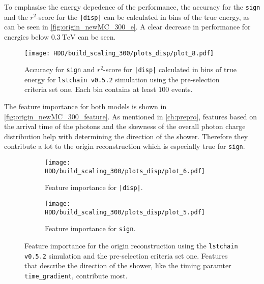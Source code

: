 To emphasise the energy depedence of the performance, the accuracy for the \texttt{sign} and the $r^2$-score for the \texttt{|disp|} can
be calculated in bins of the true energy, as can be seen in \autoref{fig:origin_newMC_300_e}.
A clear decrease in performance for energies below $\SI{0.3}{\tera\electronvolt}$ can be seen.
\begin{figure}
    \centering
    \texttt{[image: HDD/build\_scaling\_300/plots\_disp/plot\_8.pdf]}
    \caption{Accuracy for \texttt{sign} and $r^2$-score for \texttt{|disp|} calculated in bins of true energy for 
        \texttt{lstchain v0.5.2} simulation using the pre-selection criteria set one.
        Each bin contains at least $\num{100}$ events.
    }
    \label{fig:origin_newMC_300_e}
\end{figure}

The feature importance for both models is shown in \autoref{fig:origin_newMC_300_feature}.
As mentioned in \autoref{ch:prepro}, features based on the arrival time of the photons and the skewness of the overall photon charge distribution
help with determining the direction of the shower.
Therefore they contribute a lot to the origin reconstruction which is especially true for \texttt{sign}.
\begin{figure}
    \centering
    \begin{subfigure}{0.49\textwidth}
        \centering
        \texttt{[image: HDD/build\_scaling\_300/plots\_disp/plot\_6.pdf]}
        \caption{Feature importance for \texttt{|disp|}.}
    \end{subfigure}
    \hfill
    \begin{subfigure}{0.49\textwidth}
        \centering
        \texttt{[image: HDD/build\_scaling\_300/plots\_disp/plot\_5.pdf]}
        \caption{Feature importance for \texttt{sign}.}
    \end{subfigure}
    \caption{Feature importance for the origin reconstruction using the \texttt{lstchain v0.5.2} simulation and the pre-selection criteria set one.
        Features that describe the direction of the shower, like the timing paramter \texttt{time\_gradient}, contribute most.
    }
    \label{fig:origin_newMC_300_feature}
\end{figure}

